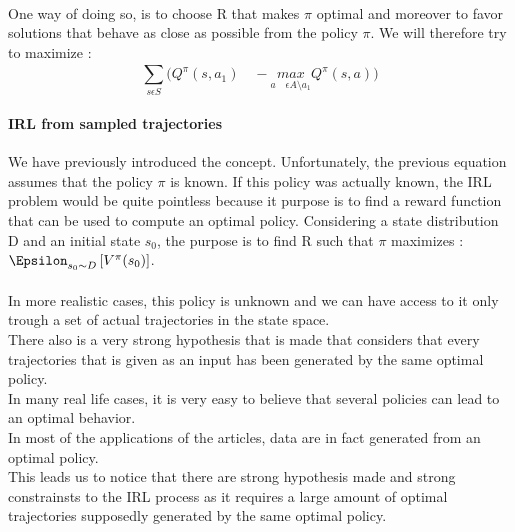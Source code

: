 \documentclass{article}
\begin{document}
\paragraph{}
One way of doing so, is to choose R that makes $\pi$ optimal and moreover to favor solutions that behave as close as possible from the policy $\pi$.
We will therefore try to maximize : $$
\sum _{ s\epsilon S }^{ \quad  }{ ({ Q }^{ \pi  } } (s,{ a }_{ 1 })\quad - \underset { a\quad \epsilon A\setminus { a }_{ 1 } }{ max } { Q }^{ \pi  }(s,a))
$$
\paragraph{IRL from sampled trajectories\\}

We have previously introduced the concept. Unfortunately, the previous equation assumes that the policy $\pi$ is known. If this policy was actually known, the IRL problem would be quite pointless because it purpose is to find a reward function that can be used to compute an optimal policy.
Considering a state distribution D and an initial state $s_{0}$, the purpose is to find R such that $\pi$ maximizes :
$ { \Epsilon  }_{ s_{ 0 }\sim D }\left[ { V }^{ \pi  }({ s }_{ 0 }) \right]$.
\paragraph{}

In more realistic cases, this policy is unknown and we can have access to it only trough a set of actual trajectories in the state space.\\
There also is a very strong hypothesis that is made that considers that every trajectories that is given as an input has been generated by the same optimal policy. \\
In many real life cases, it is very easy to believe that several policies can lead to an optimal behavior.\\
In most of the applications of the articles, data are in fact generated from an optimal policy.\\
This leads us to notice that there are strong hypothesis made and strong constrainsts to the IRL process as it requires a large amount of optimal trajectories supposedly generated by the same optimal policy.
\end{document}

